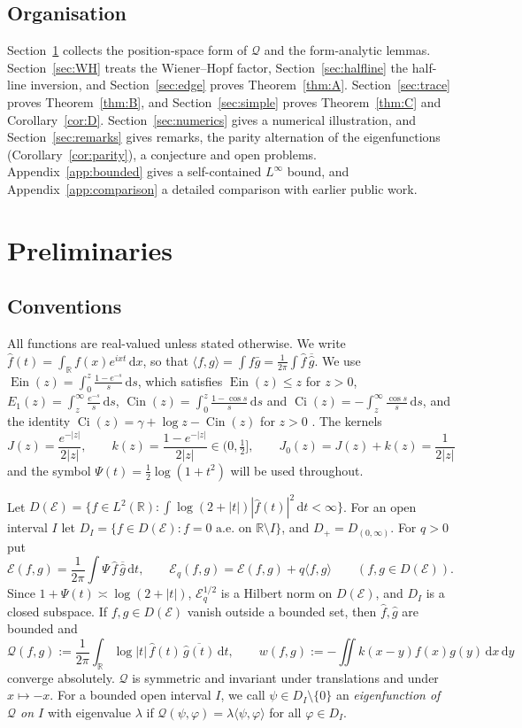 \documentclass[11pt]{amsart}
\newcommand{\R}{\mathbb{R}}
\newcommand{\E}{\mathcal{E}}
\newcommand{\dd}{\,\mathrm{d}}
\DeclareMathOperator{\Ein}{Ein}
\DeclareMathOperator{\Cin}{Cin}
\DeclareMathOperator{\Ci}{Ci}
\theoremstyle{definition}
\theoremstyle{remark}
\numberwithin{equation}{section}
\begin{document}
\subsection*{Organisation}
Section~\ref{sec:prelim} collects the position-space form of $\mathcal Q$ and the form-analytic lemmas. Section~\ref{sec:WH} treats the Wiener--Hopf factor, Section~\ref{sec:halfline} the half-line inversion, and Section~\ref{sec:edge} proves Theorem~\ref{thm:A}. Section~\ref{sec:trace} proves Theorem~\ref{thm:B}, and Section~\ref{sec:simple} proves Theorem~\ref{thm:C} and Corollary~\ref{cor:D}. Section~\ref{sec:numerics} gives a numerical illustration, and Section~\ref{sec:remarks} gives remarks, the parity alternation of the eigenfunctions (Corollary~\ref{cor:parity}), a conjecture and open problems. Appendix~\ref{app:bounded} gives a self-contained $L^\infty$ bound, and Appendix~\ref{app:comparison} a detailed comparison with earlier public work.

\section{Preliminaries}\label{sec:prelim}

\subsection{Conventions}
All functions are real-valued unless stated otherwise. We write $\hat f(t)=\int_\R f(x)e^{ixt}\dd x$, so that $\langle f,g\rangle=\int f\bar g=\frac1{2\pi}\int\hat f\,\overline{\hat g}$. We use $\Ein(z)=\int_0^z\frac{1-e^{-s}}s\dd s$, which satisfies $\Ein(z)\le z$ for $z>0$, $E_1(z)=\int_z^\infty\frac{e^{-s}}s\dd s$, $\Cin(z)=\int_0^z\frac{1-\cos s}s\dd s$ and $\Ci(z)=-\int_z^\infty\frac{\cos s}s\dd s$, and the identity $\Ci(z)=\gamma+\log z-\Cin(z)$ for $z>0$ \cite[\S6.2]{DLMF}. The kernels
\[
J(z)=\frac{e^{-|z|}}{2|z|},\qquad k(z)=\frac{1-e^{-|z|}}{2|z|}\in(0,\tfrac12],\qquad J_0(z)=J(z)+k(z)=\frac1{2|z|}
\]
and the symbol $\Psi(t)=\frac12\log(1+t^2)$ will be used throughout.

Let $D(\E)=\{f\in L^2(\R):\int\log(2+|t|)|\hat f(t)|^2\dd t<\infty\}$. For an open interval $I$ let $D_I=\{f\in D(\E):f=0\text{ a.e.\ on }\R\setminus I\}$, and $D_+=D_{(0,\infty)}$. For $q>0$ put
\[
\E(f,g)=\frac1{2\pi}\int\Psi\,\hat f\,\overline{\hat g}\dd t,\qquad \E_q(f,g)=\E(f,g)+q\langle f,g\rangle\qquad(f,g\in D(\E)).
\]
Since $1+\Psi(t)\asymp\log(2+|t|)$, $\E_q^{1/2}$ is a Hilbert norm on $D(\E)$, and $D_I$ is a closed subspace. If $f,g\in D(\E)$ vanish outside a bounded set, then $\hat f,\hat g$ are bounded and
\[
\mathcal Q(f,g):=\frac1{2\pi}\int_\R\log|t|\,\hat f(t)\,\overline{\hat g(t)}\dd t,\qquad w(f,g):=-\iint k(x-y)f(x)g(y)\dd x\dd y
\]
converge absolutely. $\mathcal Q$ is symmetric and invariant under translations and under $x\mapsto-x$. For a bounded open interval $I$, we call $\psi\in D_I\setminus\{0\}$ an \emph{eigenfunction of $\mathcal Q$ on $I$} with eigenvalue $\lambda$ if $\mathcal Q(\psi,\varphi)=\lambda\langle\psi,\varphi\rangle$ for all $\varphi\in D_I$.
\end{document}

